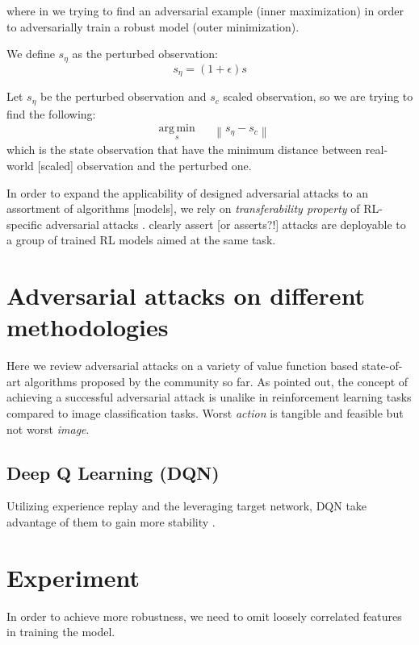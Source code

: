 \documentclass[letterpaper,12pt]{article}
\DeclareMathOperator*{\argmin}{arg\,min}
\newcommand{\norm}[1]{\left\lVert#1\right\rVert}
\begin{document}
where in we trying to find an adversarial example (inner maximization) in order to adversarially train a robust model (outer minimization).

We define $s_\eta$ as the perturbed observation:
\begin{equation}
    s_\eta = (1 + \epsilon) s
\end{equation}


Let $s_\eta$ be the perturbed observation and $s_c$ scaled observation, so we are trying to find the following:
\begin{equation}
\begin{aligned}
& \underset{s}{\argmin}
& & {\norm{s_\eta - s_c}}
\end{aligned}
\end{equation}
which is the state observation that have the minimum distance between real-world [scaled] observation and the perturbed one.

In order to expand the applicability of designed adversarial attacks to an assortment of algorithms [models], we rely on \textit{transferability property} of RL-specific adversarial attacks \cite{Szegedy2014, Papernot2016, Goodfellow2014a}. \citet{Huang2017} clearly assert [or asserts?!] attacks are deployable to a group of trained RL models aimed at the same task.  

\section{Adversarial attacks on different methodologies}
Here we review adversarial attacks on a variety of value function based state-of-art algorithms proposed by the community so far. As \citet{Pattanaik2018} pointed out, the concept of achieving a successful adversarial attack is unalike in reinforcement learning tasks compared to image classification tasks. Worst \textit{action} is tangible and feasible but not worst \textit{image}.

\subsection{Deep Q Learning (DQN)}
Utilizing experience replay and the leveraging target network, DQN take advantage of them to gain more stability \cite{Pattanaik2018}.

\section{Experiment}
In order to achieve more robustness, we need to omit loosely correlated features in training the model.
\end{document}
